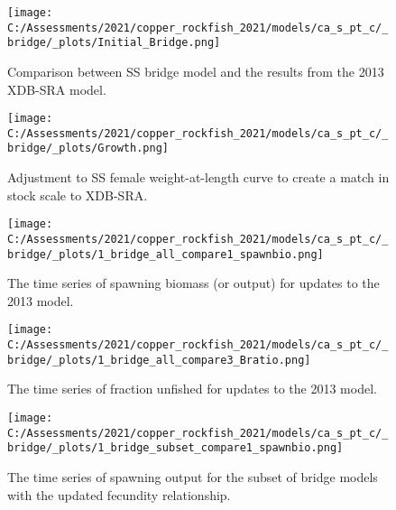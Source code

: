 \documentclass[11pt,
  english,
  a4paper,
]{article}
\begin{document}
\tagmcend\tagstructend


\begin{figure}
\centering
\texttt{[image: C:/Assessments/2021/copper\_rockfish\_2021/models/ca\_s\_pt\_c/\_bridge/\_plots/Initial\_Bridge.png]}
\caption{Comparison between SS bridge model and the results from the 2013 XDB-SRA model.\label{fig:bridge-1}}
\end{figure}

\tagmcend\tagstructend


\begin{figure}
\centering
\texttt{[image: C:/Assessments/2021/copper\_rockfish\_2021/models/ca\_s\_pt\_c/\_bridge/\_plots/Growth.png]}
\caption{Adjustment to SS female weight-at-length curve to create a match in stock scale to XDB-SRA.\label{fig:bridge-growth}}
\end{figure}

\tagmcend\tagstructend


\begin{figure}
\centering
\texttt{[image: C:/Assessments/2021/copper\_rockfish\_2021/models/ca\_s\_pt\_c/\_bridge/\_plots/1\_bridge\_all\_compare1\_spawnbio.png]}
\caption{The time series of spawning biomass (or output) for updates to the 2013 model.\label{fig:bridge-ssb}}
\end{figure}

\tagmcend\tagstructend


\begin{figure}
\centering
\texttt{[image: C:/Assessments/2021/copper\_rockfish\_2021/models/ca\_s\_pt\_c/\_bridge/\_plots/1\_bridge\_all\_compare3\_Bratio.png]}
\caption{The time series of fraction unfished for updates to the 2013 model.\label{fig:bridge-depl}}
\end{figure}

\tagmcend\tagstructend


\begin{figure}
\centering
\texttt{[image: C:/Assessments/2021/copper\_rockfish\_2021/models/ca\_s\_pt\_c/\_bridge/\_plots/1\_bridge\_subset\_compare1\_spawnbio.png]}
\caption{The time series of spawning output for the subset of bridge models with the updated fecundity relationship.\label{fig:bridge-ssb-2}}
\end{figure}
\end{document}
